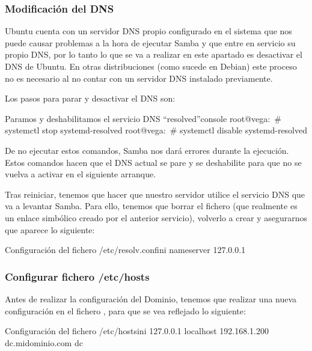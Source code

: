\subsubsection{Modificación del DNS}
Ubuntu cuenta con un servidor DNS propio configurado en el sistema que nos puede causar problemas a la hora de ejecutar Samba y que entre en servicio su propio DNS, por lo tanto lo que se va a realizar en este apartado es desactivar el DNS de Ubuntu. En otras distribuciones (como sucede en Debian) este proceso no es necesario al no contar con un servidor DNS instalado previamente.

Los pasos para parar y desactivar el DNS son:

\begin{mycode}{Paramos y deshabilitamos el servicio DNS “resolved”}{console}{}
root@vega:~# systemctl stop systemd-resolved
root@vega:~# systemctl disable systemd-resolved
\end{mycode}

De no ejecutar estos comandos, Samba nos dará errores durante la ejecución. Estos comandos hacen que el DNS actual se pare y se deshabilite para que no se vuelva a activar en el siguiente arranque.


Tras reiniciar, tenemos que hacer que nuestro servidor utilice el servicio DNS que va a levantar Samba. Para ello, tenemos que borrar el fichero    (que realmente es un enlace simbólico creado por el anterior servicio), volverlo a crear y  asegurarnos que aparece lo siguiente:

\begin{mycode}{Configuración del fichero  \faFile \hspace{1pt} /etc/resolv.conf}{ini}{}
nameserver 127.0.0.1
\end{mycode}


\subsubsection{Configurar fichero /etc/hosts}
Antes de realizar la configuración del Dominio, tenemos que realizar una nueva configuración en el fichero   , para que se vea reflejado lo siguiente:

\begin{mycode}{Configuración del fichero  \faFile \hspace{1pt} /etc/hosts}{ini}{}
127.0.0.1      localhost
192.168.1.200  dc.midominio.com dc
\end{mycode}

